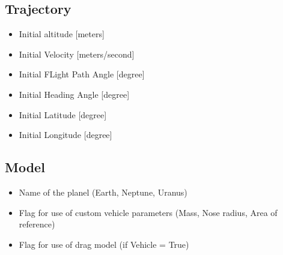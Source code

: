 \documentclass[letterpaper,10pt,english]{sphinxmanual}
\begin{document}
\subsection{Trajectory}
\label{\detokenize{usage:trajectory}}\begin{itemize}
\item {} 
\sphinxAtStartPar
{} \sphinxhyphen{} Initial altitude {[}meters{]}

\item {} 
\sphinxAtStartPar
{} \sphinxhyphen{} Initial Velocity {[}meters/second{]}

\item {} 
\sphinxAtStartPar
{} \sphinxhyphen{} Initial FLight Path Angle {[}degree{]}

\item {} 
\sphinxAtStartPar
{} \sphinxhyphen{} Initial Heading Angle {[}degree{]}

\item {} 
\sphinxAtStartPar
{} \sphinxhyphen{} Initial Latitude {[}degree{]}

\item {} 
\sphinxAtStartPar
{} \sphinxhyphen{} Initial Longitude {[}degree{]}

\end{itemize}


\subsection{Model}
\label{\detokenize{usage:model}}\begin{itemize}
\item {} 
\sphinxAtStartPar
{} \sphinxhyphen{} Name of the planel (Earth, Neptune, Uranus)

\item {} 
\sphinxAtStartPar
{} \sphinxhyphen{} Flag for use of custom vehicle parameters (Mass, Nose radius, Area of reference)

\item {} 
\sphinxAtStartPar
{} \sphinxhyphen{} Flag for use of drag model (if Vehicle = True)

\end{itemize}
\end{document}

